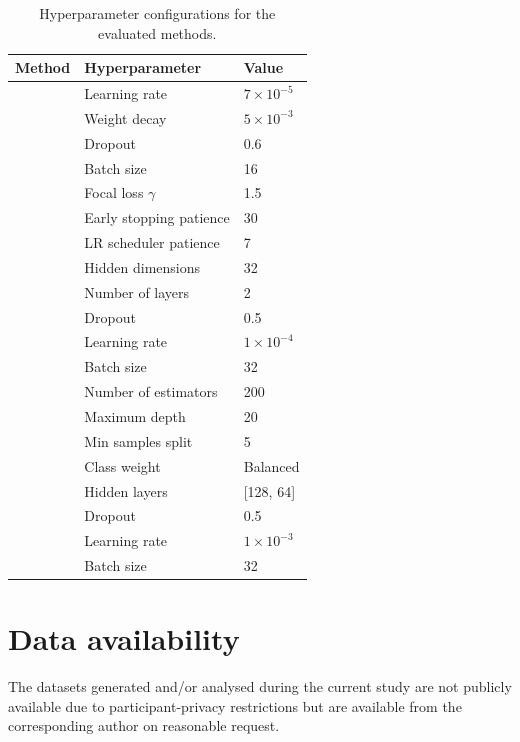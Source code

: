 \documentclass[pdflatex,sn-nature,iicol]{sn-jnl}
\begin{document}
\begin{table}[h]
  \caption{Hyperparameter configurations for the evaluated methods.}
  \label{tab:hyperparameters}
  \begin{tabular*}{\columnwidth}{@{\extracolsep{\fill}}lll@{}}
    \toprule
    Method & Hyperparameter & Value \\
    \midrule
      & Learning rate & $7 \times 10^{-5}$ \\
      & Weight decay & $5 \times 10^{-3}$ \\
      & Dropout & 0.6 \\
      & Batch size & 16 \\
      & Focal loss $\gamma$ & 1.5 \\
      & Early stopping patience & 30 \\
      & LR scheduler patience & 7 \\
    \midrule
      & Hidden dimensions & 32 \\
      & Number of layers & 2 \\
      & Dropout & 0.5 \\
      & Learning rate & $1 \times 10^{-4}$ \\
      & Batch size & 32 \\
    \midrule
      & Number of estimators & 200 \\
      & Maximum depth & 20 \\
      & Min samples split & 5 \\
      & Class weight & Balanced \\
    \midrule
      & Hidden layers & [128, 64] \\
      & Dropout & 0.5 \\
      & Learning rate & $1 \times 10^{-3}$ \\
      & Batch size & 32 \\
    \bottomrule
  \end{tabular*}
\end{table}

\backmatter

\section*{Data availability}
The datasets generated and/or analysed during the current study are not publicly available due to participant-privacy restrictions but are available from the corresponding author on reasonable request.
\end{document}
